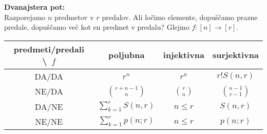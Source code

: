 \documentclass[a4paper, oneside, 10pt]{article}
\theoremstyle{definition}
\begin{document}
\textbf{Dvanajstera pot:}\\
Razporejamo $n$ predmetov v $r$ predalov. Ali ločimo elemente,
dopuščamo prazne predale, dopuščamo več kot en predmet v predalu?  Glejmo 
$f\colon[n] \to [r]$.

\begin{tabular}{|c|c|c|c|}
  \hline
  predmeti/predali \textbackslash\ $f$ & poljubna & injektivna & surjektivna \\ \hline
  DA/DA & $r^n$ & $r^{\underline{n}}$ & $r!S(n, r)$ \\ \hline
  NE/DA & $\binom{r+n-1}{n}$ & $\binom{r}{n}$ & $\binom{n-1}{r-1}$ \\ \hline
  DA/NE & $\sum_{k=1}^rS(n, r)$ & $n \leq r$ & $S(n, r)$ \\ \hline
  NE/NE & $\sum_{k=1}^rp(n; r)$ & $n \leq r$ & $p(n; r)$ \\ \hline
\end{tabular}
\end{document}
